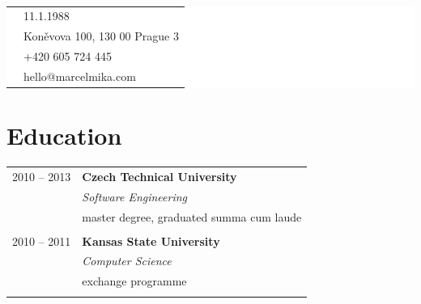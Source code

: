 \documentclass[10pt]{article} %
\begin{document}
\begin{minipage}[t]{0.5\textwidth}
\hspace{3pt}
\begin{minipage}{\textwidth} %
\raggedright
\mbox{}\\[-40pt]
\colorbox{white}{\textcolor{text1}{
\begin{tabular}{c|p{\textwidth}}
\raisebox{0pt}{\textborn} & 11.1.1988 \\ %
\raisebox{-1pt}{\textifsymbol{18}} & Koněvova 100, 130 00 Prague 3 \\ %
\raisebox{0pt}{\Telefon} & +420 605 724 445 \\ %
\raisebox{0pt}{\Letter} & hello@marcelmika.com \\ %
\end{tabular}
}}
\end{minipage}%


\hspace{5pt}
\section{Education} 
\medskip
\begin{tabular}{@{}rl@{}} 


\small\textsc{2010 -- 2013} & \large\textbf{Czech Technical University} \\ 
& \normalsize\textit{Software Engineering} \\ 
& \normalsize {master degree, graduated summa cum laude} \\ 
&\\


\small\textsc{2010 -- 2011} & \large\textbf{Kansas State University} \\ 
& \normalsize\textit{Computer Science} \\ 
& \normalsize {exchange programme} \\ 
&\\
	 


\end{tabular}
\end{minipage}
\end{document}
